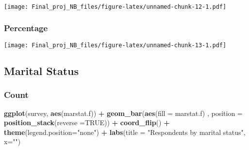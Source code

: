 \documentclass[]{article}
\newenvironment{Shaded}{\begin{snugshade}}{\end{snugshade}}
\newcommand{\KeywordTok}[1]{\textcolor[rgb]{0.13,0.29,0.53}{\textbf{#1}}}
\newcommand{\DataTypeTok}[1]{\textcolor[rgb]{0.13,0.29,0.53}{#1}}
\newcommand{\DecValTok}[1]{\textcolor[rgb]{0.00,0.00,0.81}{#1}}
\newcommand{\StringTok}[1]{\textcolor[rgb]{0.31,0.60,0.02}{#1}}
\newcommand{\OtherTok}[1]{\textcolor[rgb]{0.56,0.35,0.01}{#1}}
\newcommand{\ControlFlowTok}[1]{\textcolor[rgb]{0.13,0.29,0.53}{\textbf{#1}}}
\newcommand{\OperatorTok}[1]{\textcolor[rgb]{0.81,0.36,0.00}{\textbf{#1}}}
\newcommand{\NormalTok}[1]{#1}
\begin{document}
\texttt{[image: Final\_proj\_NB\_files/figure-latex/unnamed-chunk-12-1.pdf]}

\subsubsection{Percentage}\label{percentage-1}

\begin{Shaded}
\end{Shaded}

\texttt{[image: Final\_proj\_NB\_files/figure-latex/unnamed-chunk-13-1.pdf]}

\subsection{Marital Status}\label{marital-status}

\subsubsection{Count}\label{count-3}

\begin{Shaded}
\begin{Highlighting}[]
\KeywordTok{ggplot}\NormalTok{(survey, }\KeywordTok{aes}\NormalTok{(marstat.f)) }\OperatorTok{+}
\StringTok{  }\KeywordTok{geom_bar}\NormalTok{(}\KeywordTok{aes}\NormalTok{(}\DataTypeTok{fill =}\NormalTok{ marstat.f) , }\DataTypeTok{position =} \KeywordTok{position_stack}\NormalTok{(}\DataTypeTok{reverse =}\OtherTok{TRUE}\NormalTok{)) }\OperatorTok{+}
\StringTok{  }\KeywordTok{coord_flip}\NormalTok{() }\OperatorTok{+}\StringTok{ }\KeywordTok{theme}\NormalTok{(}\DataTypeTok{legend.position=}\StringTok{"none"}\NormalTok{) }\OperatorTok{+}\StringTok{ }
\StringTok{  }\KeywordTok{labs}\NormalTok{(}\DataTypeTok{title =} \StringTok{"Respondents by marital status"}\NormalTok{, }\DataTypeTok{x=}\StringTok{""}\NormalTok{)}
\end{Highlighting}
\end{Shaded}
\end{document}
